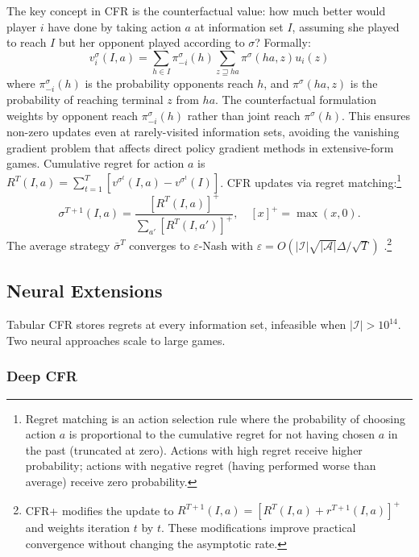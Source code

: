 The key concept in CFR is the counterfactual value: how much better would player $i$ have done by taking action $a$ at information set $I$, assuming she played to reach $I$ but her opponent played according to $\sigma$? Formally:
\begin{equation}
v^\sigma_i(I, a) = \sum_{h \in I} \pi^\sigma_{-i}(h) \sum_{z \sqsupseteq ha} \pi^\sigma(ha, z) u_i(z)
\end{equation}
where $\pi^\sigma_{-i}(h)$ is the probability opponents reach $h$, and $\pi^\sigma(ha, z)$ is the probability of reaching terminal $z$ from $ha$. The counterfactual formulation weights by opponent reach $\pi^\sigma_{-i}(h)$ rather than joint reach $\pi^\sigma(h)$. This ensures non-zero updates even at rarely-visited information sets, avoiding the vanishing gradient problem that affects direct policy gradient methods in extensive-form games. Cumulative regret for action $a$ is $R^T(I,a) = \sum_{t=1}^T [v^{\sigma^t}(I,a) - v^{\sigma^t}(I)]$. CFR updates via regret matching:\footnote{Regret matching is an action selection rule where the probability of choosing action $a$ is proportional to the cumulative regret for not having chosen $a$ in the past (truncated at zero). Actions with high regret receive higher probability; actions with negative regret (having performed worse than average) receive zero probability.}
\begin{equation}
\sigma^{T+1}(I, a) = \frac{[R^T(I, a)]^+}{\sum_{a'} [R^T(I, a')]^+}, \quad [x]^+ = \max(x,0).
\end{equation}
The average strategy $\bar{\sigma}^T$ converges to $\varepsilon$-Nash with $\varepsilon = O(|\mathcal{I}|\sqrt{|\mathcal{A}|}\Delta / \sqrt{T})$ \citep{zinkevich2008}.\footnote{CFR+ \citep{tammelin2014solving} modifies the update to $R^{T+1}(I, a) = [R^T(I, a) + r^{T+1}(I, a)]^+$ and weights iteration $t$ by $t$. These modifications improve practical convergence without changing the asymptotic rate.}

\subsection{Neural Extensions}

Tabular CFR stores regrets at every information set, infeasible when $|\mathcal{I}| > 10^{14}$. Two neural approaches scale to large games.

\subsubsection{Deep CFR}

